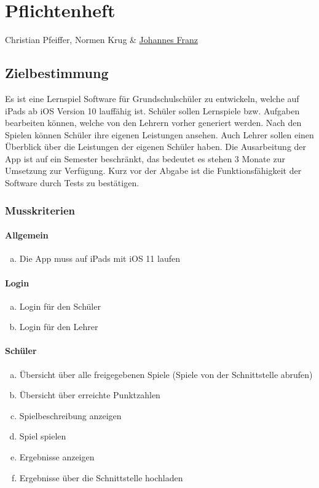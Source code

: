 \chapter{Pflichtenheft}
Christian Pfeiffer, Normen Krug \& \href{mailto:jofranz90@gmail.com?subject=Swift-Studienarbeit}{Johannes Franz}


\section{Zielbestimmung}
Es ist eine Lernspiel Software für Grundschulschüler zu entwickeln, welche auf iPads ab iOS Version 10 lauffähig ist. Schüler sollen Lernspiele bzw. Aufgaben bearbeiten können, welche von den Lehrern vorher generiert werden. Nach den Spielen können Schüler ihre eigenen Leistungen ansehen. Auch Lehrer sollen einen Überblick über die Leistungen der eigenen Schüler haben. Die Ausarbeitung der App ist auf ein Semester beschränkt, das bedeutet es stehen 3 Monate zur Umsetzung zur Verfügung. Kurz vor der Abgabe ist die Funktionsfähigkeit der Software durch Tests zu bestätigen.

\subsection{Musskriterien}

\subsubsection{Allgemein}
\begin{enumerate}[a)]
\item Die App muss auf iPads mit iOS 11 laufen
\end{enumerate}



\subsubsection{Login}
\begin{enumerate}[a)]
\item Login für den Schüler
\item Login für den Lehrer
\end{enumerate}

\subsubsection{Schüler}
\begin{enumerate}[a)]
\item Übersicht über alle freigegebenen Spiele (Spiele von der Schnittstelle abrufen)
\item Übersicht über erreichte Punktzahlen
\item Spielbeschreibung anzeigen
\item Spiel spielen
\item Ergebnisse anzeigen
\item Ergebnisse über die Schnittstelle hochladen
\end{enumerate}

